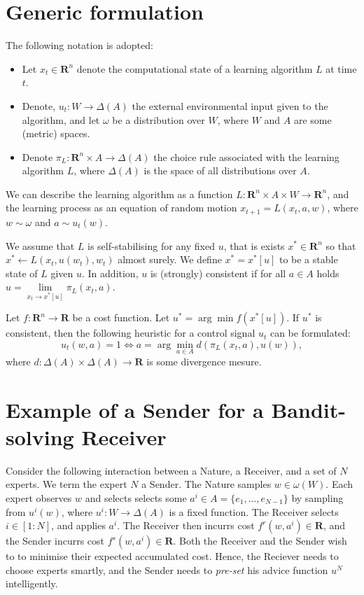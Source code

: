 \documentclass{article}
\begin{document}
\section*{Generic formulation}

The following notation is adopted:
\begin{itemize}
\item Let $x_t\in\mathbf{R}^n$ denote the computational state of a learning
algorithm $L$ at time $t$. 
\item Denote, $u_t:W\rightarrow\Delta(A)$ the external environmental input given to the algorithm, and let
$\omega$ be a distribution over $W$, where $W$ and $A$ are some (metric) spaces. 
\item Denote $\pi_L:\mathbf{R}^n\times A\rightarrow \Delta(A)$ the choice rule associated with the learning algorithm $L$, where $\Delta(A)$ is the space of all distributions over $A$.
\end{itemize}

We can describe the learning algorithm as a function
$L:\mathbf{R}^n\times A\times W\rightarrow \mathbf{R}^n$, and the
learning process as an equation of random motion
$x_{t+1}=L(x_t,a,w)$, where $w\sim\omega$ and $a\sim u_t(w)$. 

We assume that $L$ is self-stabilising for any fixed
$u$, that is exists $x^*\in\mathbf{R}^n$ so that $x^*\leftarrow
L(x_t,u(w_t),w_t)$ almost surely. We define $x^*=x^*[u]$ to be a stable state of $L$ given $u$. In addition, $u$ is (strongly) consistent if for all $a\in A$ holds $u=\lim\limits_{x_t\rightarrow x^*[u]}\pi_L(x_t,a)$.

Let $f:\mathbf{R}^n\rightarrow\mathbf{R}$ be a cost function. Let $u^*=\arg\min\limits f(x^*[u])$. If $u^*$ is consistent, then the following heuristic for a control signal $u_t$ can be formulated:
$$
u_t(w,a)=1 \iff a = \arg\min\limits_{a\in A} d(\pi_L(x_t,a),u(w)),
$$
where $d:\Delta(A)\times\Delta(A)\rightarrow\mathbf{R}$ is some divergence mesure.

\section*{Example of a Sender for a Bandit-solving Receiver}
Consider the following interaction between a Nature, a Receiver, and a
set of $N$ experts. We term the expert $N$ a Sender. The Nature
samples $w\in \omega(W)$. Each expert observes $w$ and selects selects
some $a^i\in A=\{e_1,...,e_{N-1}\}$ by sampling from $u^i(w)$, where
$u^i:W\rightarrow\Delta(A)$ is a fixed function. The Receiver selects
$i\in[1:N]$, and applies $a^i$. The Receiver then incurrs cost
$f^r(w,a^i)\in\mathbf{R}$, and the Sender incurrs cost $f^s(w,a^i)\in\mathbf{R}$. Both the Receiver and the Sender wish to to minimise their expected accumulated cost. Hence, the Reciever needs to choose experts smartly, and the Sender needs to {\em pre-set} his advice function $u^N$ intelligently. 
\end{document}
